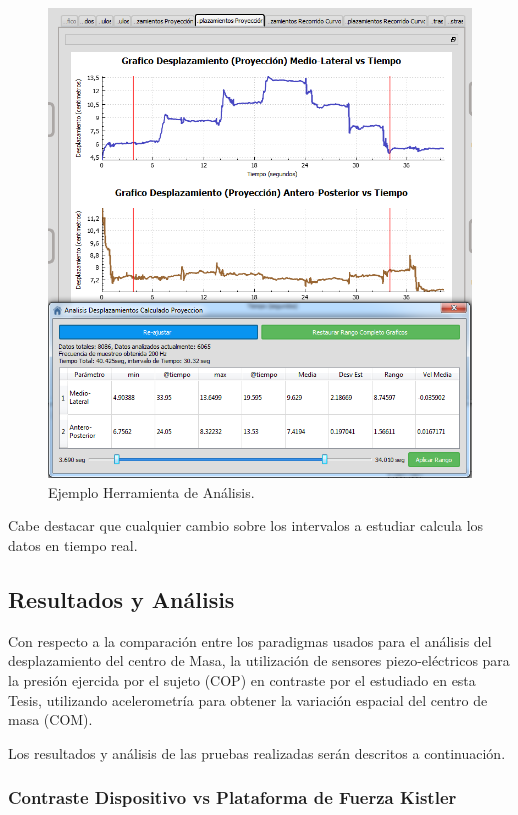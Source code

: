 \documentclass[12pt,a4paper]{article}
\begin{document}
\begin{figure}[H]
	\centering
	\includegraphics[scale=0.75]{images/graficosyreportes/analisisGraficos}
	\caption{Ejemplo Herramienta de Análisis.}
	\label{fig:analsisGraficos}
\end{figure}

Cabe destacar que cualquier cambio sobre los intervalos a estudiar calcula los datos en tiempo real.

\newpage
\subsection{Resultados y Análisis}
Con respecto a la comparación entre los paradigmas usados para el análisis del desplazamiento del centro de Masa, la utilización de sensores piezo-eléctricos para la presión ejercida por el sujeto (COP) en contraste por el estudiado en esta Tesis, utilizando acelerometría para obtener la variación espacial del centro de masa (COM).

Los resultados y análisis de las pruebas realizadas serán descritos a continuación.

\subsubsection{Contraste Dispositivo vs Plataforma de Fuerza Kistler}
\end{document}
